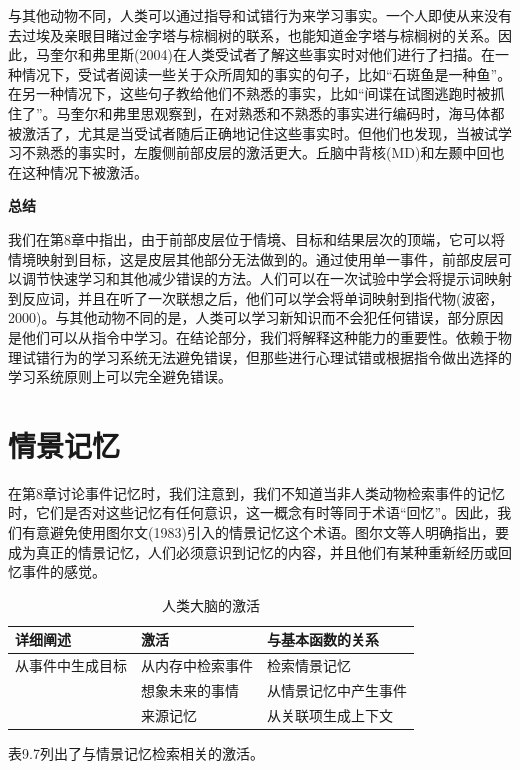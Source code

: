 \par
与其他动物不同，人类可以通过指导和试错行为来学习事实。一个人即使从来没有去过埃及亲眼目睹过金字塔与棕榈树的联系，也能知道金字塔与棕榈树的关系。因此，马奎尔和弗里斯(2004)在人类受试者了解这些事实时对他们进行了扫描。在一种情况下，受试者阅读一些关于众所周知的事实的句子，比如“石斑鱼是一种鱼”。在另一种情况下，这些句子教给他们不熟悉的事实，比如“间谍在试图逃跑时被抓住了”。马奎尔和弗里思观察到，在对熟悉和不熟悉的事实进行编码时，海马体都被激活了，尤其是当受试者随后正确地记住这些事实时。但他们也发现，当被试学习不熟悉的事实时，左腹侧前部皮层的激活更大。丘脑中背核(MD)和左颞中回也在这种情况下被激活。
\par
\textbf{总结}
\par
我们在第8章中指出，由于前部皮层位于情境、目标和结果层次的顶端，它可以将情境映射到目标，这是皮层其他部分无法做到的。通过使用单一事件，前部皮层可以调节快速学习和其他减少错误的方法。人们可以在一次试验中学会将提示词映射到反应词，并且在听了一次联想之后，他们可以学会将单词映射到指代物(波密，2000)。与其他动物不同的是，人类可以学习新知识而不会犯任何错误，部分原因是他们可以从指令中学习。在结论部分，我们将解释这种能力的重要性。依赖于物理试错行为的学习系统无法避免错误，但那些进行心理试错或根据指令做出选择的学习系统原则上可以完全避免错误。
\section{情景记忆}
在第8章讨论事件记忆时，我们注意到，我们不知道当非人类动物检索事件的记忆时，它们是否对这些记忆有任何意识，这一概念有时等同于术语“回忆”。因此，我们有意避免使用图尔文(1983)引入的情景记忆这个术语。图尔文等人明确指出，要成为真正的情景记忆，人们必须意识到记忆的内容，并且他们有某种重新经历或回忆事件的感觉。
\par
\begin{table}[htbp] 
	\newcommand{\tabincell}[2]{\begin{tabular}{@{}#1@{}}#2\end{tabular}} %
	\centering
	\caption{人类大脑的激活\label{tab:9_7}}
	\renewcommand\arraystretch{1.5}	%
	\begin{tabular}{lll}
		\toprule
		详细阐述 & 激活 & 与基本函数的关系\\
		\midrule
		从事件中生成目标 & 从内存中检索事件 & 检索情景记忆  \\
		& 想象未来的事情 & 从情景记忆中产生事件 \\
		& 来源记忆 & 从关联项生成上下文 \\
		\bottomrule
		
	\end{tabular}%
\end{table}%
表9.7列出了与情景记忆检索相关的激活。
